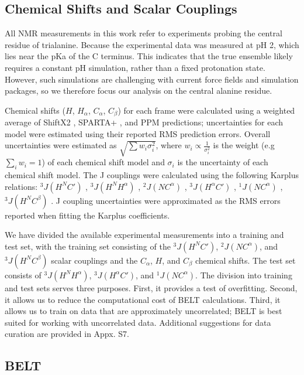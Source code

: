 \documentclass[11pt,titlepage]{article}
\begin{document}
\subsection*{Chemical Shifts and Scalar Couplings}

All NMR measurements in this work refer to experiments  \citep{Graf2007} probing the central residue of trialanine.  Because the experimental data was measured at pH 2, which lies near the pKa of the C terminus.  This indicates that the true ensemble likely requires a constant pH simulation, rather than a fixed protonation state.  However, such simulations are challenging with current force fields and simulation packages, so we therefore focus our analysis on the central alanine residue.  

Chemical shifts ($H$, $H_\alpha$, $C_\alpha$, $C_\beta$) for each frame were calculated using a weighted average of ShiftX2 \citep{han2011shiftx2}, SPARTA+  \citep{Shen2010}, and PPM \citep{li2012ppm} predictions; uncertainties for each model were estimated using their reported RMS prediction errors.  Overall uncertainties were estimated as $\sqrt{\sum w_i \sigma_i^2}$, where $w_i \propto \frac{1}{\sigma_i^2}$ is the weight (e.g $\sum_i w_i = 1$) of each chemical shift model and $\sigma_i$ is the uncertainty of each chemical shift model.  The J couplings were calculated using the following Karplus relations: $^3J(H^N C')$  \citep{vogeli2007limits}, $^3J(H^N H^\alpha)$  \citep{vogeli2007limits}, $^2J(N C^\alpha)$  \citep{Graf2007}, $^3J(H^\alpha C')$  \citep{Schmidt1999}, $^1J(N C^\alpha)$  \citep{Graf2007}, $^3J(H^N C^\beta)$  \citep{vogeli2007limits}.  J coupling uncertainties were approximated as the RMS errors reported when fitting the Karplus coefficients.  

We have divided the available experimental measurements into a training and test set, with the training set consisting of the $^3J(H^N C')$,  $^2J(N C^\alpha)$, and $^3J(H^N C^\beta)$ scalar couplings and the $C_\alpha$, $H$, and $C_\beta$ chemical shifts.  The test set consists of $^3J(H^N H^\alpha)$, $^3J(H^\alpha C')$, and $^1J(N C^\alpha)$.  The division into training and test sets serves three purposes.  First, it provides a test of overfitting.  Second, it allows us to reduce the computational cost of BELT calculations.  Third, it allows us to train on data that are approximately uncorrelated; BELT is best suited for working with uncorrelated data.  Additional suggestions for data curation are provided in Appx. S7.  

\subsection*{BELT}
\end{document}
